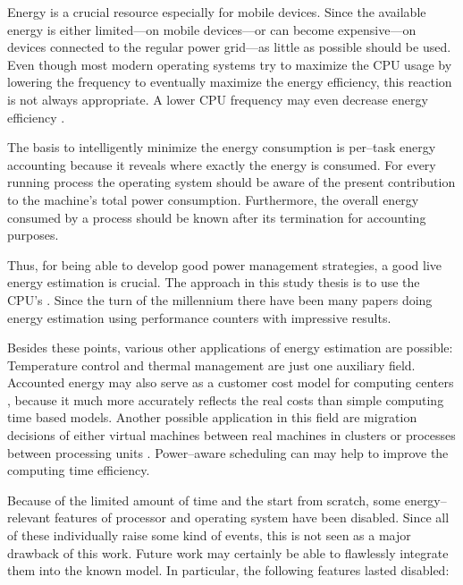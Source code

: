 
Energy is a crucial resource especially for mobile devices. Since the available
energy is either limited---on mobile devices---or can become expensive---on
devices connected to the regular power grid---as little as possible should be
used. Even though most modern operating systems try to maximize the CPU usage by
lowering the frequency \cite{snowdon2010operating} to eventually maximize the
energy efficiency, this reaction is not always appropriate. A lower CPU
frequency may even decrease energy efficiency
\cite{weissel2002process,snowdon2010operating}.

The basis to intelligently minimize the energy consumption is per--task energy
accounting because it reveals where exactly the energy is consumed. For every
running process the operating system should be aware of the present contribution
to the machine's total power consumption. Furthermore, the overall energy
consumed by a process should be known after its termination for accounting
purposes.

Thus, for being able to develop good power management strategies, a good live
energy estimation is crucial. The approach in this study thesis is to use the
CPU's . Since the turn of the millennium
\cite{bellosa2000benefits} there have been many papers
\cite{Bertran2010,bertran2010decomposable,kellner03tempcontrol,isci2003runtime,
weissel2002process} doing energy estimation using performance counters with
impressive results.

Besides these points, various other applications of energy estimation are
possible: Temperature control \cite{kellner03tempcontrol} and thermal management
\cite{merkel05tmsmpsys} are just one auxiliary field. Accounted energy may also
serve as a customer cost model for computing centers \cite{Bertran2010}, because
it much more accurately reflects the real costs than simple computing time based
models. Another possible application in this field are migration decisions of
either virtual machines between real machines in clusters or processes between
processing units \cite{merkel10rcscheduling}. Power--aware scheduling can may
help to improve the computing time efficiency.


\label{sec:restrictions}

Because of the limited amount of time and the start from scratch, some
energy--relevant features of processor and operating system have been disabled.
Since all of these individually raise some kind of events, this is not seen as a
major drawback of this work.  Future work may certainly be able to flawlessly
integrate them into the known model. In particular, the following features
lasted disabled:


